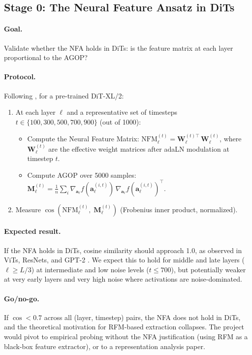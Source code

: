 \documentclass[11pt]{article}
\newcommand{\ba}{\mathbf{a}}
\newcommand{\bM}{\mathbf{M}}
\newcommand{\bW}{\mathbf{W}}
\begin{document}
\subsection{Stage 0: The Neural Feature Ansatz in DiTs}
\label{sec:exp_stage0}

\paragraph{Goal.} Validate whether the NFA holds in DiTs: is the feature matrix at each layer proportional to the AGOP?

\paragraph{Protocol.}
Following \citet{radhakrishnan2024mechanism}, for a pre-trained DiT-XL/2:
\begin{enumerate}[leftmargin=*]
    \item At each layer $\ell$ and a representative set of timesteps $t \in \{100, 300, 500, 700, 900\}$ (out of 1000):
    \begin{itemize}
        \item Compute the Neural Feature Matrix: $\mathrm{NFM}_\ell^{(t)} = \bW_\ell^{(t)\top}\, \bW_\ell^{(t)}$, where $\bW_\ell^{(t)}$ are the effective weight matrices after adaLN modulation at timestep $t$.
        \item Compute AGOP over 5000 samples: $\bM_\ell^{(t)} = \frac{1}{n}\sum_i \nabla_{\ba_\ell} f(\ba_\ell^{(i,t)})\, \nabla_{\ba_\ell} f(\ba_\ell^{(i,t)})^\top$.
    \end{itemize}
    \item Measure $\cos(\mathrm{NFM}_\ell^{(t)},\; \bM_\ell^{(t)})$ (Frobenius inner product, normalized).
\end{enumerate}

\paragraph{Expected result.}
If the NFA holds in DiTs, cosine similarity should approach 1.0, as observed in ViTs, ResNets, and GPT-2 \citep{radhakrishnan2024mechanism}.
We expect this to hold for middle and late layers ($\ell \geq L/3$) at intermediate and low noise levels ($t \leq 700$), but potentially weaker at very early layers and very high noise where activations are noise-dominated.

\paragraph{Go/no-go.}
If $\cos < 0.7$ across all (layer, timestep) pairs, the NFA does not hold in DiTs, and the theoretical motivation for RFM-based extraction collapses.
The project would pivot to empirical probing without the NFA justification (using RFM as a black-box feature extractor), or to a representation analysis paper.
\end{document}
